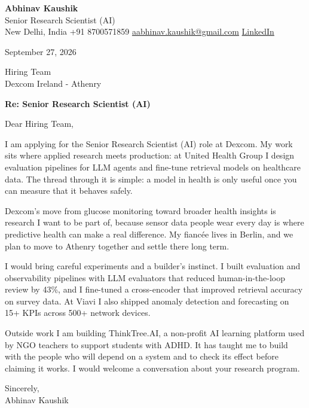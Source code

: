 \documentclass[11pt,a4paper]{article}
\begin{document}
{\Large\bfseries Abhinav Kaushik}\\
Senior Research Scientist (AI)\\
New Delhi, India \textbar{} +91 8700571859 \textbar{} \href{mailto:aabhinav.kaushik@gmail.com}{aabhinav.kaushik@gmail.com} \textbar{} \href{https://www.linkedin.com/in/abhinav-kaushik10/}{LinkedIn}  

September 27, 2026

Hiring Team\\
Dexcom Ireland - Athenry

\textbf{Re: Senior Research Scientist (AI)}

Dear Hiring Team,

I am applying for the Senior Research Scientist (AI) role at Dexcom. My work sits where applied research meets production: at United Health Group I design evaluation pipelines for LLM agents and fine-tune retrieval models on healthcare data. The thread through it is simple: a model in health is only useful once you can measure that it behaves safely.

Dexcom's move from glucose monitoring toward broader health insights is research I want to be part of, because sensor data people wear every day is where predictive health can make a real difference. My fiancée lives in Berlin, and we plan to move to Athenry together and settle there long term.

I would bring careful experiments and a builder's instinct. I built evaluation and observability pipelines with LLM evaluators that reduced human-in-the-loop review by 43\%, and I fine-tuned a cross-encoder that improved retrieval accuracy on survey data. At Viavi I also shipped anomaly detection and forecasting on 15+ KPIs across 500+ network devices.

Outside work I am building ThinkTree.AI, a non-profit AI learning platform used by NGO teachers to support students with ADHD. It has taught me to build with the people who will depend on a system and to check its effect before claiming it works. I would welcome a conversation about your research program.

Sincerely,\\[4pt]
Abhinav Kaushik
\end{document}
